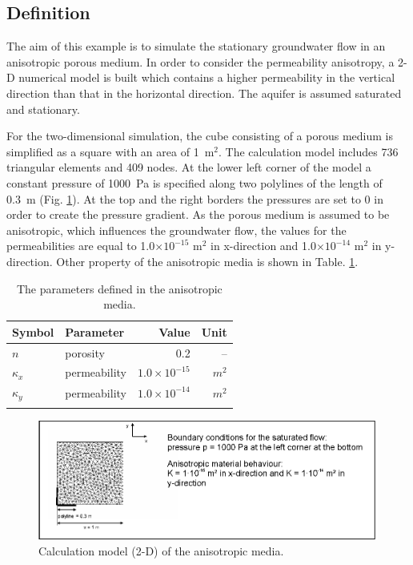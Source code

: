 \subsection{Definition}

The aim of this example is to simulate the stationary groundwater flow in an anisotropic porous medium. In order to consider the permeability anisotropy, a 2-D numerical model is built which contains a higher permeability in the vertical direction than that in the horizontal direction. The aquifer is assumed saturated and stationary.


For the two-dimensional simulation, the cube consisting of a porous medium is simplified as a square with an area of 1~m$^2$. The calculation model includes 736 triangular elements and 409 nodes. At the lower left corner of the model a constant pressure of 1000~Pa is specified along two polylines of the length of 0.3~m (Fig. \ref{GW:anisrotropic}). At the top and the right borders the pressures are set to 0 in order to create the pressure gradient. As the porous medium is assumed to be anisotropic, which influences the groundwater flow, the values for the permeabilities are equal to 1.0$\times 10^{-15}$ m$^2$ in x-direction and 1.0$\times 10^{-14}$ m$^2$ in y-direction. Other property of the anisotropic media is shown in Table. \ref{tab22}. 

\begin{table}[h!]
\centering
\caption{The parameters defined in the anisotropic media.}
\begin{tabular*}{0.9\textwidth}{@{\extracolsep{\fill}}llrr}
\hline\noalign{\smallskip}
 Symbol &Parameter& Value & Unit \\ 
\hline\noalign{\smallskip}
$n$ 				&porosity  		& 0.2 									&  --  \\			
$\kappa_x$ 	&permeability & $1.0\times 10^{-15}$  & $m^2$ \\
$\kappa_y$ 	&permeability & $1.0\times 10^{-14}$ 	& $m^2$ \\
\noalign{\smallskip}\hline
\end{tabular*}
\label{tab22}
\end{table}

\begin{figure}[h!]
\centering
\includegraphics[width=1.0\textwidth]{Chapter5/figure/anisotropicdomain.eps}
\caption{Calculation model (2-D) of the anisotropic media.}
\label{GW:anisrotropic}
\end{figure}

